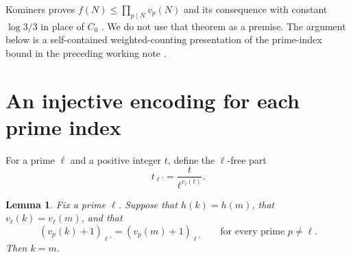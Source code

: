 \documentclass[11pt,a4paper]{article}
\newtheorem{lemma}[theorem]{Lemma}
\theoremstyle{remark}
\begin{document}
Kominers proves $f(N)\le\prod_{p\mid N}v_p(N)$ and its consequence with constant $\log3/3$ in place of $C_0$ \cite[Theorem 1.2 and Corollary 1.3]{Kominers}. We do not use that theorem as a premise. The argument below is a self-contained weighted-counting presentation of the prime-index bound in the preceding working note \cite{WorkingNote}.

\section{An injective encoding for each prime index}
For a prime $\ell$ and a positive integer $t$, define the $\ell$-free part
\[
t_{\ell'}=\frac{t}{\ell^{v_\ell(t)}}.
\]

\begin{lemma}\label{lem:encoding}
Fix a prime $\ell$. Suppose that $h(k)=h(m)$, that $v_\ell(k)=v_\ell(m)$, and that
\[
(v_p(k)+1)_{\ell'}=(v_p(m)+1)_{\ell'}
\qquad\text{for every prime }p\ne\ell.
\]
Then $k=m$.
\end{lemma}
\end{document}
